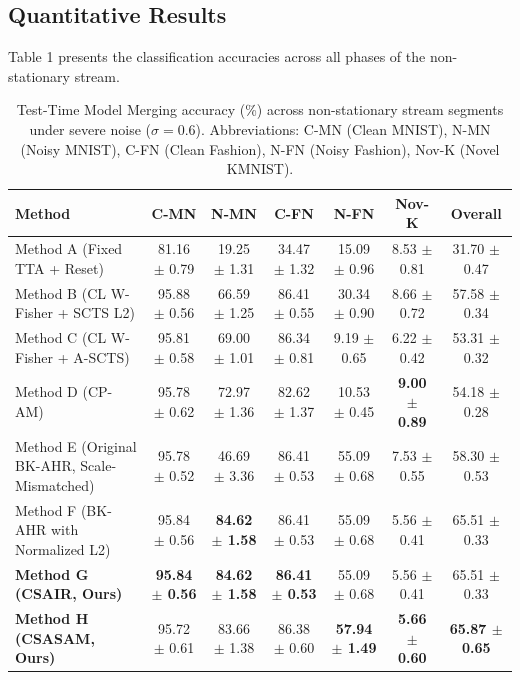 \documentclass{article}
\theoremstyle{plain}
\theoremstyle{definition}
\theoremstyle{remark}
\begin{document}
\subsection{Quantitative Results}

Table 1 presents the classification accuracies across all phases of the non-stationary stream.

\begin{table}[t]
\caption{Test-Time Model Merging accuracy (\%) across non-stationary stream segments under severe noise ($\sigma=0.6$). Abbreviations: C-MN (Clean MNIST), N-MN (Noisy MNIST), C-FN (Clean Fashion), N-FN (Noisy Fashion), Nov-K (Novel KMNIST).}
\label{tab:results}
\begin{center}
\begin{scriptsize}
\begin{sc}
\setlength{\tabcolsep}{2.5pt}
\begin{tabular}{lcccccc}
\toprule
Method & C-MN & N-MN & C-FN & N-FN & Nov-K & Overall \\
\midrule
Method A (Fixed TTA + Reset)                  & 81.16 $\pm$ 0.79 & 19.25 $\pm$ 1.31 & 34.47 $\pm$ 1.32 & 15.09 $\pm$ 0.96 & 8.53 $\pm$ 0.81 & 31.70 $\pm$ 0.47 \\
Method B (CL W-Fisher + SCTS L2)              & 95.88 $\pm$ 0.56 & 66.59 $\pm$ 1.25 & 86.41 $\pm$ 0.55 & 30.34 $\pm$ 0.90 & 8.66 $\pm$ 0.72 & 57.58 $\pm$ 0.34 \\
Method C (CL W-Fisher + A-SCTS)              & 95.81 $\pm$ 0.58 & 69.00 $\pm$ 1.01 & 86.34 $\pm$ 0.81 & 9.19 $\pm$ 0.65 & 6.22 $\pm$ 0.42 & 53.31 $\pm$ 0.32 \\
Method D (CP-AM)                             & 95.78 $\pm$ 0.62 & 72.97 $\pm$ 1.36 & 82.62 $\pm$ 1.37 & 10.53 $\pm$ 0.45 & \textbf{9.00 $\pm$ 0.89} & 54.18 $\pm$ 0.28 \\
Method E (Original BK-AHR, Scale-Mismatched) & 95.78 $\pm$ 0.52 & 46.69 $\pm$ 3.36 & 86.41 $\pm$ 0.53 & 55.09 $\pm$ 0.68 & 7.53 $\pm$ 0.55 & 58.30 $\pm$ 0.53 \\
Method F (BK-AHR with Normalized L2)         & 95.84 $\pm$ 0.56 & \textbf{84.62 $\pm$ 1.58} & 86.41 $\pm$ 0.53 & 55.09 $\pm$ 0.68 & 5.56 $\pm$ 0.41 & 65.51 $\pm$ 0.33 \\
\textbf{Method G (CSAIR, Ours)}              & \textbf{95.84 $\pm$ 0.56} & \textbf{84.62 $\pm$ 1.58} & \textbf{86.41 $\pm$ 0.53} & 55.09 $\pm$ 0.68 & 5.56 $\pm$ 0.41 & 65.51 $\pm$ 0.33 \\
\textbf{Method H (CSASAM, Ours)}             & 95.72 $\pm$ 0.61 & 83.66 $\pm$ 1.38 & 86.38 $\pm$ 0.60 & \textbf{57.94 $\pm$ 1.49} & \textbf{5.66 $\pm$ 0.60} & \textbf{65.87 $\pm$ 0.65} \\
\bottomrule
\end{tabular}
\end{sc}
\end{scriptsize}
\end{center}
\end{table}
\end{document}
